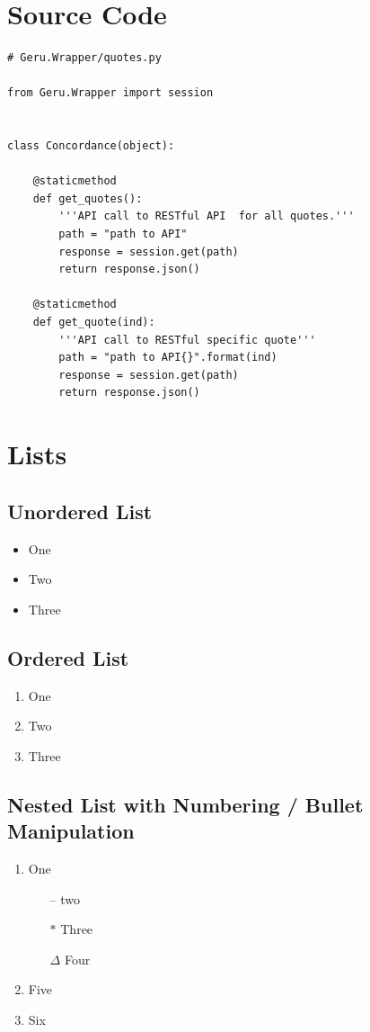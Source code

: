 \documentclass{article}
\begin{document}
\newpage
\section{Source Code}
\begin{lstlisting}
# Geru.Wrapper/quotes.py

from Geru.Wrapper import session


class Concordance(object):

    @staticmethod
    def get_quotes():
        '''API call to RESTful API  for all quotes.'''
        path = "path to API"
        response = session.get(path)
        return response.json()

    @staticmethod
    def get_quote(ind):
        '''API call to RESTful specific quote'''
        path = "path to API{}".format(ind)
        response = session.get(path)
        return response.json()
\end{lstlisting}

\section{Lists}

\subsection{Unordered List}
\begin{itemize}
 \item One
 \item Two
 \item Three
\end{itemize}

\subsection{Ordered List}
\begin{enumerate}
 \item One
 \item Two
 \item Three
\end{enumerate}

\subsection{Nested List with Numbering / Bullet Manipulation}
\begin{enumerate}[label=$\Gamma$]
 \item One
       \begin{enumerate}
        \item[--] two
        \item[$\ast$] Three
        \item[$\Delta$] Four
       \end{enumerate}
 \item Five
 \item Six
\end{enumerate}
\end{document}

